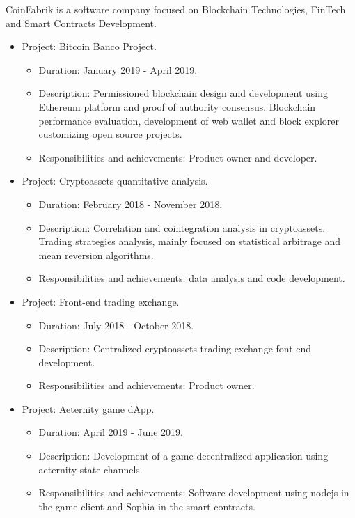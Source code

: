 \documentclass[11pt,a4paper,sans]{moderncv}        %
\begin{document}
{CoinFabrik is a software company focused on Blockchain Technologies, FinTech and Smart Contracts Development.
\begin{itemize}
\item Project: Bitcoin Banco Project.
	\begin{itemize}%
	\item Duration: January 2019 - April 2019.
	\item Description: Permissioned blockchain design and development using Ethereum platform and proof of authority consensus.
	Blockchain performance evaluation, development of web wallet and block explorer customizing open source projects.
	\item Responsibilities and achievements: Product owner and developer.
	\end{itemize}
\item Project: Cryptoassets quantitative analysis.
	\begin{itemize}%
	\item Duration: February 2018 - November 2018.
	\item Description: Correlation and cointegration analysis in cryptoassets. 
	Trading strategies analysis, mainly focused on statistical arbitrage and mean reversion algorithms.
	\item Responsibilities and achievements: data analysis and code development.
\end{itemize}
\item Project: Front-end trading exchange.
	\begin{itemize}%
	\item Duration: July 2018 - October 2018.
	\item Description: Centralized cryptoassets trading exchange font-end development.
	\item Responsibilities and achievements: Product owner.
	\end{itemize}
\item Project: Aeternity game dApp.
	\begin{itemize}%
	\item Duration: April 2019 - June 2019.
	\item Description: Development of a game decentralized application using aeternity state channels.
	\item Responsibilities and achievements: Software development using nodejs in the game client and Sophia in the smart contracts.

\end{itemize}
\end{itemize}}
\end{document}
